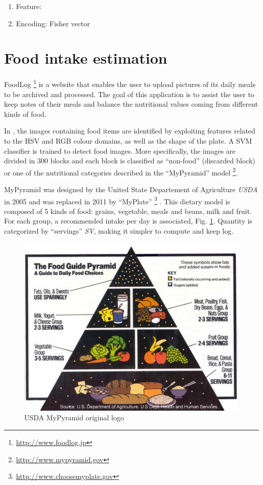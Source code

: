 \begin{enumerate}
    \item Feature:
    
    
    \item Encoding: Fisher vector
\end{enumerate}

\section{Food intake estimation}


FoodLog \footnote{\url{http://www.foodlog.jp}} is a website that enables the user to upload pictures of its daily meals to be archived and processed. The goal of this application is to assist the user to keep notes of their meals and balance the nutritional values coming from different kinds of food.

In \cite{Kitamura2008}, the images containing food items are identified by exploiting features related to the HSV and RGB colour domains, as well as the shape of the plate. A SVM classifier is trained to detect food images. More specifically, the images are divided in 300 blocks and each block is classified as \enquote{non-food} (discarded block) or one of the nutritional categories described in the \enquote{MyPyramid} model \footnote{\url{http://www.mypyramid.gov}}.

MyPyramid \cite{MyPyramid} was designed by the United State Departement of Agriculture \textit{USDA} in 2005 and was replaced in 2011 by \enquote{MyPlate} \footnote{\url{http://www.choosemyplate.gov}} \cite{MyPlate}. This dietary model is composed of 5 kinds of food: grains, vegetable, meals and beans, milk and fruit. For each group, a recommended intake per day is associated, Fig. \ref{fig:my_pyramid}. Quantity is categorized by \enquote{servings} \textit{SV}, making it simpler to compute and keep log.

\begin{figure}
    \centering
    \includegraphics[scale=0.8]{img/my_pyramid.jpg}
    \caption{USDA MyPyramid original logo}
    \label{fig:my_pyramid}
\end{figure}

